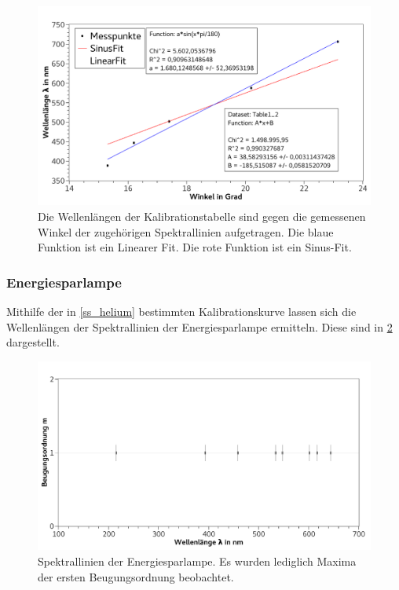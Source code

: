 \documentclass[
	a4paper,
	12pt,
	pagesize,
	ngerman
]{scrartcl}
\begin{document}
	\begin{figure}[H] 
		\includegraphics[width=1\textwidth]{fig_helium} 
		\centering
		\caption{Die Wellenlängen der Kalibrationstabelle sind gegen die gemessenen Winkel der zugehörigen Spektrallinien aufgetragen.
		Die blaue Funktion ist ein Linearer Fit.
		Die rote Funktion ist ein Sinus-Fit.}
		\label{fig_helium}
		\centering
	\end{figure}
	\subsubsection{Energiesparlampe}
	Mithilfe der in \cref{ss_helium} bestimmten Kalibrationskurve lassen sich die Wellenlängen der Spektrallinien der Energiesparlampe ermitteln.
	Diese sind in \cref{fig_spar} dargestellt.


	\begin{figure}[H] 
		\includegraphics[width=1\textwidth]{fig_spar} 
		\centering
		\caption{Spektrallinien der Energiesparlampe. 
		Es wurden lediglich Maxima der ersten Beugungsordnung beobachtet.}
		\label{fig_spar}
		\centering
	\end{figure}	
\end{document}
